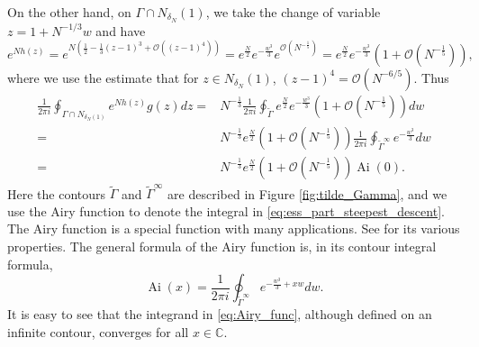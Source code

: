 \documentclass[11pt, a4paper]{article}
\numberwithin{equation}{section}
\newcommand{\bigO}{\mathcal{O}}
\newcommand{\compC}{\mathbb{C}}
\DeclareMathOperator{\Ai}{Ai}
\theoremstyle{definition}
\theoremstyle{remark}
\begin{document}
On the other hand, on $\Gamma \cap N_{\delta_N}(1)$, we take the change of variable $z = 1 + N^{-1/3}w$ and have
\begin{equation} \label{eq:exp(h)_when_x=2}
  e^{N h(z)} = e^{N(\frac{1}{2} - \frac{1}{3}(z - 1)^3 + \bigO((z - 1)^4))} = e^{\frac{N}{2}} e^{-\frac{w^3}{3}} e^{\bigO(N^{-\frac{1}{5}})} = e^{\frac{N}{2}} e^{-\frac{w^3}{3}} (1 + \bigO(N^{-\frac{1}{5}})),
\end{equation}
where we use the estimate that for $z \in N_{\delta_N}(1)$, $(z - 1)^4 = \bigO(N^{-6/5})$. Thus
\begin{equation} \label{eq:ess_part_steepest_descent}
  \begin{split}
    \frac{1}{2\pi i} \oint_{\Gamma \cap N_{\delta_N(1)}} e^{Nh(z)} g(z) dz = {}& N^{-\frac{1}{3}} \frac{1}{2\pi i} \oint_{\tilde{\Gamma}} e^{\frac{N}{2}} e^{-\frac{w^3}{3}} (1 + \bigO(N^{-\frac{1}{5}})) dw \\
    = {}& N^{-\frac{1}{3}}  e^{\frac{N}{2}} (1 + \bigO(N^{-\frac{1}{5}})) \frac{1}{2\pi i} \oint_{\tilde{\Gamma}^{\infty}} e^{-\frac{w^3}{3}} dw \\
    = {}& N^{-\frac{1}{3}}  e^{\frac{N}{2}} (1 + \bigO(N^{-\frac{1}{5}})) \Ai(0).
  \end{split}
\end{equation}
Here the contours $\tilde{\Gamma}$ and $\tilde{\Gamma}^{\infty}$ are described in Figure \ref{fig:tilde_Gamma}, and we use the Airy function to denote the integral in \eqref{eq:ess_part_steepest_descent}. The Airy function is a special function with many applications. See \cite{Abramowitz-Stegun64} for its various properties. The general formula of the Airy function is, in its contour integral formula,
\begin{equation} \label{eq:Airy_func}
  \Ai(x) = \frac{1}{2\pi i} \oint_{\tilde{\Gamma}^{\infty}}
  e^{-\frac{w^3}{3} + xw} dw.
\end{equation}
It is easy to see that the integrand in \eqref{eq:Airy_func}, although defined on an infinite contour, converges for all $x \in \compC$.
\end{document}
